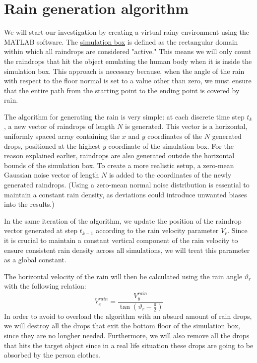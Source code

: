 \documentclass[12pt]{report}
\begin{document}
        \newpage
        \section{Rain generation algorithm}
            We will start our investigation by creating a virtual rainy environment using the MATLAB software. The \underline{simulation box} is defined as the rectangular domain within which all raindrops are considered "active." This means we will only count the raindrops that hit the object emulating the human body when it is inside the simulation box. This approach is necessary because, when the angle of the rain with respect to the floor normal is set to a value other than zero, we must ensure that the entire path from the starting point to the ending point is covered by rain.

            The algorithm for generating the rain is very simple: at each discrete time step $t_k$, a new vector of raindrops of length $N$ is generated. This vector is a horizontal, uniformly spaced array containing the $x$ and $y$ coordinates of the $N$ generated drops, positioned at the highest $y$ coordinate of the simulation box. For the reason explained earlier, raindrops are also generated outside the horizontal bounds of the simulation box. To create a more realistic setup, a zero-mean Gaussian noise vector of length $N$ is added to the coordinates of the newly generated raindrops. (Using a zero-mean normal noise distribution is essential to maintain a constant rain density, as deviations could introduce unwanted biases into the results.)
            
            In the same iteration of the algorithm, we update the position of the raindrop vector generated at step $t_{k-1}$ according to the rain velocity parameter $V_r$. Since it is crucial to maintain a constant vertical component of the rain velocity to ensure consistent rain density across all simulations, we will treat this parameter as a global constant. 
            
            \newpage
            The horizontal velocity of the rain will then be calculated using the rain angle $\vartheta_r$ with the following relation:
            \begin{equation}
            V^{rain}_x = \frac{V^{rain}_y}{\tan(\vartheta_r - \frac{\pi}{2})}
            \end{equation}
            In order to avoid to overload the algorithm with an absurd amount of rain drops, we will destroy all the drops that exit the bottom floor of the simulation box, since they are no longher needed. Furthermore, we will also remove all the drops that hits the target object since in a real life situation these drops are going to be absorbed by the person clothes.
\end{document}
